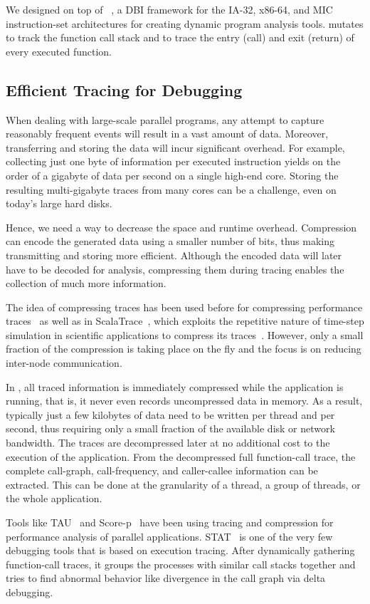 We designed \parlot on top of \pin~\cite{pin}, a DBI framework for the IA-32, x86-64, and MIC instruction-set architectures for creating dynamic program analysis tools. \parlot mutates \pin to track the function call stack and to trace the entry (call) and exit (return) of every executed function.


\subsection{Efficient Tracing for Debugging}
When dealing with large-scale parallel programs, any attempt to capture reasonably frequent events will result in a vast amount of data. Moreover, transferring and storing the data will incur significant overhead. For example, collecting just one byte of information per executed instruction yields on the order of a gigabyte of data per second on a single high-end core. Storing the resulting multi-gigabyte traces from many cores can be a challenge, even on today's large hard disks.

Hence, we need a way to decrease the space and runtime overhead. Compression can encode the generated data using a smaller number of bits, thus making transmitting and storing more efficient. Although the encoded data will later have to be decoded for analysis, compressing them during tracing enables the collection of much more information.

The idea of compressing traces has been used before for compressing performance traces~\cite{eventflowgraph} as well as in ScalaTrace~\cite{scalatrace}, which exploits the repetitive nature of time-step simulation in scientific applications to compress its traces~\cite{freitag}. However, only a small fraction of the compression is taking place on the fly and the focus is on reducing inter-node communication. 

In \parlot, all traced information is immediately compressed while the application is running, that is, it never even records uncompressed data in memory. As a result, typically just a few kilobytes of data need to be written per thread and per second, thus requiring only a small fraction of the available disk or network bandwidth. The traces are decompressed later at no additional cost to the execution of the application. From the decompressed full function-call trace, the complete call-graph, call-frequency, and caller-callee information can be extracted. This can be done at the granularity of a thread, a group of threads, or the whole application.

Tools like TAU~\cite{tau} and Score-p~\cite{scorep} have been using tracing and compression for performance analysis of parallel applications. STAT~\cite{stat} is one of the very few debugging tools that is based on execution tracing. After dynamically gathering function-call traces, it groups the processes with similar call stacks together and tries to find abnormal behavior like divergence in the call graph via delta debugging.


